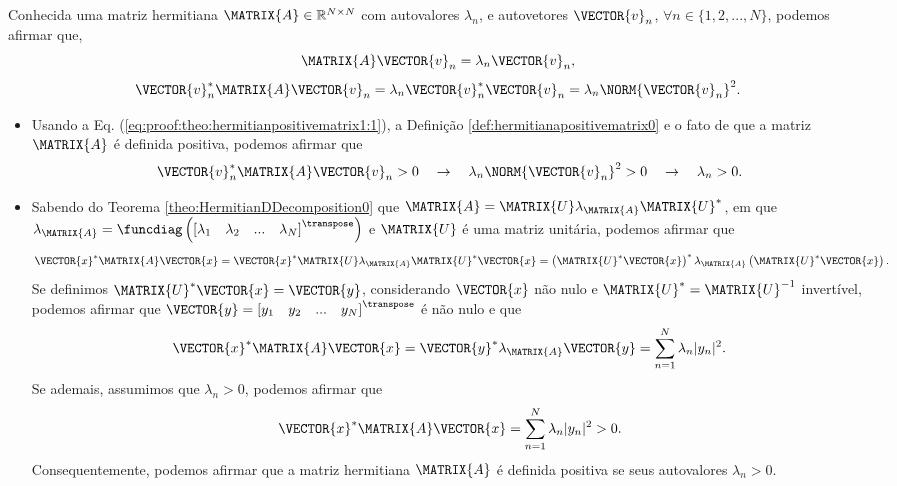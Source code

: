 \begin{myproofT}\label{proof:theo:hermitianpositivematrix1}
Conhecida uma matriz hermitiana $\MATRIX{A} \in \mathbb{R}^{N \times N}$ com  autovalores $\lambda_n$,
e autovetores $\VECTOR{v}_n$, $\forall n \in \{1, 2, ..., N\}$, podemos afirmar que,
\begin{equation}\label{eq:proof:theo:hermitianpositivematrix1:0}
\MATRIX{A}\VECTOR{v}_n=\lambda_n \VECTOR{v}_n,
\end{equation}
\begin{equation}\label{eq:proof:theo:hermitianpositivematrix1:1}
\VECTOR{v}_n^{\ast}\MATRIX{A}\VECTOR{v}_n=
\lambda_n \VECTOR{v}_n^{\ast}\VECTOR{v}_n=
\lambda_n \NORM{\VECTOR{v}_n}^2.
\end{equation}

\begin{itemize}
\item Usando a Eq. (\ref{eq:proof:theo:hermitianpositivematrix1:1}), a 
Definição \ref{def:hermitianapositivematrix0} e o fato de que a matriz $\MATRIX{A}$ é definida positiva,
podemos afirmar que
\begin{equation}
\VECTOR{v}_n^{\ast}\MATRIX{A}\VECTOR{v}_n >0
\quad \rightarrow \quad
\lambda_n \NORM{\VECTOR{v}_n}^2 > 0
\quad \rightarrow \quad
\lambda_n  > 0.
\end{equation} 
\item Sabendo do Teorema \ref{theo:HermitianDDecomposition0} que 
$\MATRIX{A}=\MATRIX{U}\lambda_{\MATRIX{A}} \MATRIX{U}^{\ast}$,
em que
$\lambda_{\MATRIX{A}}=\funcdiag\left(\left[\lambda_1\quad \lambda_2 \quad ... \quad \lambda_N \right]^{\transpose}\right)$
e $\MATRIX{U}$ é uma matriz unitária,
podemos afirmar que
\begin{equation}
\VECTOR{x}^{\ast}\MATRIX{A}\VECTOR{x}=
\VECTOR{x}^{\ast}\MATRIX{U}\lambda_{\MATRIX{A}} \MATRIX{U}^{\ast}\VECTOR{x}=
\left(\MATRIX{U}^{\ast}\VECTOR{x}\right)^{\ast}\lambda_{\MATRIX{A}}\left(\MATRIX{U}^{\ast}\VECTOR{x}\right).
\end{equation}
Se definimos $\MATRIX{U}^{\ast}\VECTOR{x}=\VECTOR{y}$, considerando
$\VECTOR{x}$ não nulo e $\MATRIX{U}^{\ast}=\MATRIX{U}^{-1}$ invertível,
podemos afirmar que 
$\VECTOR{y}=\left[y_1\quad y_2 \quad ... \quad y_N \right]^{\transpose}$ é não nulo e que 
\begin{equation}
\VECTOR{x}^{\ast}\MATRIX{A}\VECTOR{x}=
\VECTOR{y}^{\ast}\lambda_{\MATRIX{A}}\VECTOR{y}=\sum_{n=1}^{N}\lambda_n |y_n|^2.
\end{equation}
Se ademais, assumimos que $\lambda_n  > 0$, podemos afirmar que 
\begin{equation}
\VECTOR{x}^{\ast}\MATRIX{A}\VECTOR{x}=\sum_{n=1}^{N}\lambda_n |y_n|^2>0.
\end{equation}
Consequentemente, podemos afirmar que a matriz hermitiana $\MATRIX{A}$
é definida positiva se seus autovalores $\lambda_n  > 0$.
\end{itemize}
\end{myproofT}

